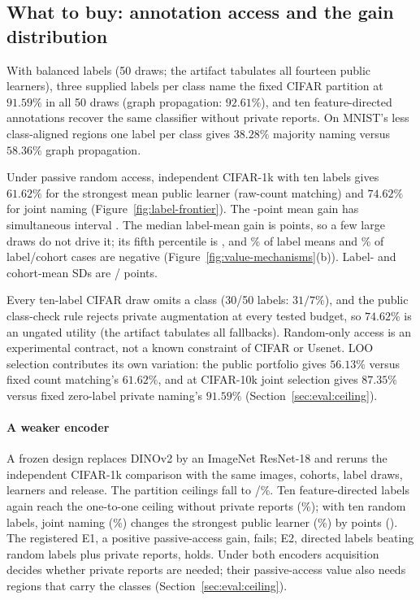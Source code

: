 \subsection{What to buy: annotation access and the gain distribution}
\label{sec:eval:main}
\label{sec:eval:frontier}

With balanced labels (50 draws; the artifact tabulates all fourteen public
learners), three supplied
labels per class name the fixed CIFAR partition at $91.59\%$ in all 50 draws
(graph propagation: $92.61\%$), and ten feature-directed annotations recover
the same classifier without private reports. On MNIST's less class-aligned
regions one label per class gives $38.28\%$ majority naming versus
$58.36\%$ graph propagation.

Under passive random access, independent CIFAR-1k with ten labels gives
$61.62\%$ for the strongest mean public learner (raw-count matching) and
$74.62\%$ for joint naming (Figure~\ref{fig:label-frontier}). The
\JointGain{}-point mean gain has simultaneous interval \JointGainCI{}. The
median label-mean gain is \GainMedian{} points, so a few large draws do not
drive it; its fifth percentile is \GainFifth{}, and \GainNegativeDraws{}\% of
label means and \GainNegativeCases{}\% of label/cohort cases are negative
(Figure~\ref{fig:value-mechanisms}(b)). Label- and cohort-mean SDs are
\LabelAxisSD{}/\CohortAxisSD{} points.

Every ten-label CIFAR draw omits a class (30/50 labels: $31/7\%$), and the
public class-check rule rejects private augmentation at every tested budget,
so $74.62\%$ is an ungated utility (the artifact tabulates all fallbacks).
Random-only access is an experimental contract, not a known constraint of
CIFAR or Usenet. LOO selection contributes its own variation: the public
portfolio gives $56.13\%$ versus fixed count matching's $61.62\%$, and at
CIFAR-10k joint selection gives $87.35\%$ versus fixed zero-label private
naming's $91.59\%$ (Section~\ref{sec:eval:ceiling}).

\paragraph{A weaker encoder}
A frozen design replaces DINOv2 by an ImageNet ResNet-18 and reruns the
independent CIFAR-1k comparison with the same images, cohorts, label draws,
learners and release. The partition ceilings fall to
\EncCeilOne{}/\EncCeilMany{}\%. Ten feature-directed labels again reach the
one-to-one ceiling without private reports (\EncDirected{}\%); with ten
random labels, joint naming (\EncJoint{}\%) changes the strongest public
learner (\EncPublic{}\%) by \EncGain{} points (\EncGainCI{}). The registered
E1, a positive passive-access gain, fails; E2, directed labels beating random
labels plus private reports, holds. Under both encoders acquisition decides
whether private reports are needed; their passive-access value also needs
regions that carry the classes (Section~\ref{sec:eval:ceiling}).

